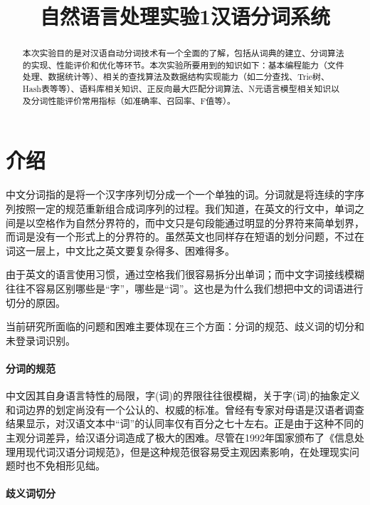 \documentclass[11pt,a4paper]{article}
\title{自然语言处理\quad 实验1\quad 汉语分词系统}
\begin{document}
	\maketitle
	\begin{abstract}
		本次实验目的是对汉语自动分词技术有一个全面的了解，包括从词典的建立、分词算法的实现、性能评价和优化等环节。本次实验所要用到的知识如下：基本编程能力（文件处理、数据统计等）、相关的查找算法及数据结构实现能力（如二分查找、Trie树、Hash表等等）、语料库相关知识、正反向最大匹配分词算法、N元语言模型相关知识以及分词性能评价常用指标（如准确率、召回率、F值等）。
	\end{abstract}
	
	\section{介绍}
	\label{Sec:Introduction}
	中文分词指的是将一个汉字序列切分成一个一个单独的词。分词就是将连续的字序列按照一定的规范重新组合成词序列的过程。我们知道，在英文的行文中，单词之间是以空格作为自然分界符的，而中文只是句段能通过明显的分界符来简单划界，而词是没有一个形式上的分界符的。虽然英文也同样存在短语的划分问题，不过在词这一层上，中文比之英文要复杂得多、困难得多。
	
	由于英文的语言使用习惯，通过空格我们很容易拆分出单词；而中文字词接线模糊往往不容易区别哪些是“字”，哪些是“词”。这也是为什么我们想把中文的词语进行切分的原因。
	
	当前研究所面临的问题和困难主要体现在三个方面：分词的规范、歧义词的切分和未登录词识别。
	
	\paragraph{分词的规范}
	
	中文因其自身语言特性的局限，字(词)的界限往往很模糊，关于字(词)的抽象定义和词边界的划定尚没有一个公认的、权威的标准。曾经有专家对母语是汉语者调查结果显示，对汉语文本中“词”的认同率仅有百分之七十左右。正是由于这种不同的主观分词差异，给汉语分词造成了极大的困难。尽管在1992年国家颁布了《信息处理用现代词汉语分词规范》，但是这种规范很容易受主观因素影响，在处理现实问题时也不免相形见绌。
	
	\paragraph{歧义词切分}
	
\end{document}

